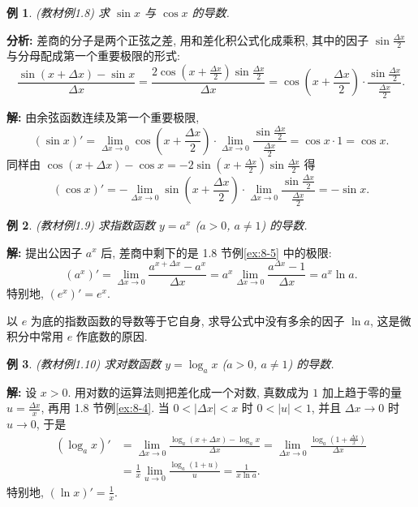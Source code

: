 \documentclass[UTF8,openany]{ctexbook}
\theoremstyle{chinesetextbook}
\newtheorem{example}{例}[section]
\newenvironment{cnsolution}{\par\indent\textbf{解:} \ignorespaces}{\par}
\begin{document}
\begin{example}\label{ex:c2-1-8}
\textnormal{(教材例1.8)} 求 $\sin x$ 与 $\cos x$ 的导数.
\end{example}
\par\indent\textbf{分析:} 差商的分子是两个正弦之差, 用和差化积公式化成乘积, 其中的因子 $\displaystyle\sin\frac{\Delta x}2$ 与分母配成第一个重要极限的形式:
\[
\frac{\sin(x+\Delta x)-\sin x}{\Delta x}=\frac{2\cos\left(x+\frac{\Delta x}2\right)\sin\frac{\Delta x}2}{\Delta x}=\cos\left(x+\frac{\Delta x}2\right)\cdot\frac{\sin\frac{\Delta x}2}{\frac{\Delta x}2}.
\]
\begin{cnsolution}
由余弦函数连续及第一个重要极限,
\[
(\sin x)'=\lim_{\Delta x\to0}\cos\left(x+\frac{\Delta x}2\right)\cdot\lim_{\Delta x\to0}\frac{\sin\frac{\Delta x}2}{\frac{\Delta x}2}=\cos x\cdot1=\cos x.
\]
同样由 $\displaystyle\cos(x+\Delta x)-\cos x=-2\sin\left(x+\frac{\Delta x}2\right)\sin\frac{\Delta x}2$ 得
\[
(\cos x)'=-\lim_{\Delta x\to0}\sin\left(x+\frac{\Delta x}2\right)\cdot\lim_{\Delta x\to0}\frac{\sin\frac{\Delta x}2}{\frac{\Delta x}2}=-\sin x.
\]
\end{cnsolution}
\begin{example}\label{ex:c2-1-9}
\textnormal{(教材例1.9)} 求指数函数 $y=a^x$ ($a>0$, $a\ne1$) 的导数.
\end{example}
\begin{cnsolution}
提出公因子 $a^x$ 后, 差商中剩下的是 1.8 节例\ref{ex:8-5} 中的极限:
\[
(a^x)'=\lim_{\Delta x\to0}\frac{a^{x+\Delta x}-a^x}{\Delta x}=a^x\lim_{\Delta x\to0}\frac{a^{\Delta x}-1}{\Delta x}=a^x\ln a.
\]
特别地, $(e^x)'=e^x$.
\end{cnsolution}
以 $e$ 为底的指数函数的导数等于它自身, 求导公式中没有多余的因子 $\ln a$, 这是微积分中常用 $e$ 作底数的原因.
\begin{example}\label{ex:c2-1-10}
\textnormal{(教材例1.10)} 求对数函数 $y=\log_ax$ ($a>0$, $a\ne1$) 的导数.
\end{example}
\begin{cnsolution}
设 $x>0$. 用对数的运算法则把差化成一个对数, 真数成为 $1$ 加上趋于零的量 $\displaystyle u=\frac{\Delta x}x$, 再用 1.8 节例\ref{ex:8-4}. 当 $0<|\Delta x|<x$ 时 $0<|u|<1$, 并且 $\Delta x\to0$ 时 $u\to0$, 于是
\[
\begin{aligned}
(\log_ax)'&=\lim_{\Delta x\to0}\frac{\log_a(x+\Delta x)-\log_ax}{\Delta x}=\lim_{\Delta x\to0}\frac{\log_a\left(1+\frac{\Delta x}x\right)}{\Delta x}\\
&=\frac1x\lim_{u\to0}\frac{\log_a(1+u)}u=\frac1{x\ln a}.
\end{aligned}
\]
特别地, $\displaystyle(\ln x)'=\frac1x$.
\end{cnsolution}
\end{document}
